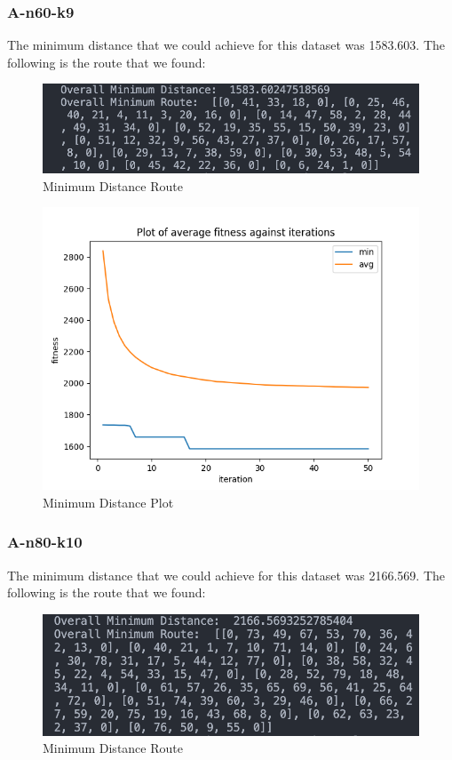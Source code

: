 \documentclass{article}
\begin{document}
\subsubsection{A-n60-k9}
The minimum distance that we could achieve for this dataset was 1583.603. The following is the route that we found:
\begin{figure}[H]
  \centering
  \includegraphics[width=1\linewidth]{images/min_dist_n60-k9.png}
  \caption{Minimum Distance Route}
\end{figure}

\begin{figure}[H]
  \centering
  \includegraphics[width=1\linewidth]{images/min_n60-k9.png}
  \caption{Minimum Distance Plot}
\end{figure}

\subsubsection{A-n80-k10}
The minimum distance that we could achieve for this dataset was 2166.569. The following is the route that we found:
\begin{figure}[H]
  \centering
  \includegraphics[width=1\linewidth]{images/min_dist_n80-k10.png}
  \caption{Minimum Distance Route}
\end{figure}
\end{document}
